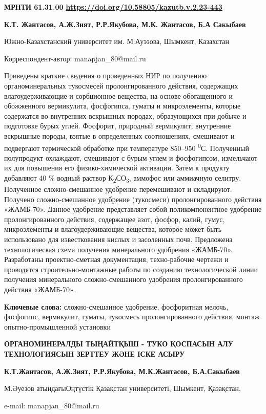 \newpage
{\bfseries МРНТИ 61.31.00}
\hfill {\bfseries \href{https://doi.org/10.58805/kazutb.v.2.23-443}{https://doi.org/10.58805/kazutb.v.2.23-443}}


\begin{center}
{\bfseries К.Т. Жантасов, А.Ж.Зият, Р.Р.Якубова, М.К. Жантасов, Б.А Сакыбаев}

Южно-Казахстанский университет им. М.Ауэзова, Шымкент, Казахстан

Корреспондент-автор: manapjan\_80@mail.ru
\end{center}

Приведены краткие сведения о проведенных НИР по получению
органоминеральных тукосмесей пролонгированного действия, содержащих
влагоудерживающие и сорбционное вещества, на основе обогащенного и
обожженного вермикулита, фосфогипса, гуматы и микроэлементы, которые
содержатся во внутренних вскрышных породах, образующихся при добыче и
подготовке бурых углей. Фосфорит, природный вермикулит, внутренние
вскрышные породы, взятые в определенных соотношениях, смешивают и
подвергают термической обработке при температуре 850--950
\textsuperscript{0}С. Полученный полупродукт охлаждают, смешивают с
бурым углем и фосфогипсом, измельчают их для повышения его
физико-химической активации. Затем к продукту добавляют 40 \% водный
раствор К\textsubscript{2}СО\textsubscript{3}, аммофос или аммиачную
селитру. Полученное сложно-смешанное удобрение перемешивают и
складируют. Получено сложно-смешанное удобрение (тукосмеси)
пролонгированного действия «ЖАМБ-70». Данное удобрение представляет
собой поликомпонентное удобрение пролонгированного действия, содержащее
азот, фосфор, калий, гумус, микроэлементы и влагоудерживающие вещества,
которое может быть использовано для известкования кислых и засоленных
почв. Предложена технологическая схема получения минерального удобрения
«ЖАМБ-70». Разработаны проектно-сметная документация, техно-рабочие
чертежи и проводятся строительно-монтажные работы по созданию
технологической линии получения минерального сложно-смешанного удобрения
пролонгированного действия «ЖАМБ-70».

{\bfseries Ключевые слова:} сложно-смешанное удобрение, фосфоритная мелочь,
фосфогипс, вермикулит, гуматы, тукосмесь пролонгированного действия,
монтаж опытно-промышленной установки

\begin{center}
{\large\bfseries ОРГАНОМИНЕРАЛДЫ ТЫҢАЙТҚЫШ - ТУКО ҚОСПАСЫН АЛУ ТЕХНОЛОГИЯСЫН ЗЕРТТЕУ ЖӘНЕ ІСКЕ АСЫРУ}

{\bfseries К.Т.Жантасов, А.Ж.Зият, Р.Р.Якубова, М.К.Жантасов, Б.А.Сакыбаев}

М.Әуезов атындағыОңтүстік Қазақстан университеті, Шымкент, Қазақстан,

e-mail: manapjan\_80@mail.ru
\end{center}

